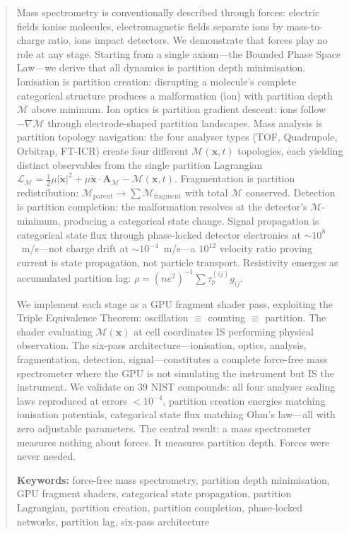 \documentclass[11pt,twocolumn,a4paper]{article}
\theoremstyle{definition}
\theoremstyle{remark}
\newcommand{\Depth}{\mathcal{M}}
\newcommand{\partinert}{\mu}
\newcommand{\taup}{\tau_p}
\newcommand{\Apartition}{\mathbf{A}_{\mathcal{M}}}
\newcommand{\Lagr}{\mathcal{L}}
\begin{document}
\begin{abstract}
Mass spectrometry is conventionally described through forces: electric fields ionise molecules, electromagnetic fields separate ions by mass-to-charge ratio, ions impact detectors. We demonstrate that forces play no role at any stage. Starting from a single axiom---the Bounded Phase Space Law---we derive that all dynamics is partition depth minimisation. Ionisation is partition creation: disrupting a molecule's complete categorical structure produces a malformation (ion) with partition depth $\Depth$ above minimum. Ion optics is partition gradient descent: ions follow $-\nabla\Depth$ through electrode-shaped partition landscapes. Mass analysis is partition topology navigation: the four analyser types (TOF, Quadrupole, Orbitrap, FT-ICR) create four different $\Depth(\mathbf{x},t)$ topologies, each yielding distinct observables from the single partition Lagrangian $\Lagr_\Depth = \frac{1}{2}\partinert|\dot{\mathbf{x}}|^2 + \partinert\dot{\mathbf{x}}\cdot\Apartition - \Depth(\mathbf{x},t)$. Fragmentation is partition redistribution: $\Depth_{\mathrm{parent}} \to \sum \Depth_{\mathrm{fragment}}$ with total $\Depth$ conserved. Detection is partition completion: the malformation resolves at the detector's $\Depth$-minimum, producing a categorical state change. Signal propagation is categorical state flux through phase-locked detector electronics at $\sim 10^8$~m/s---not charge drift at $\sim 10^{-4}$~m/s---a $10^{12}$ velocity ratio proving current is state propagation, not particle transport. Resistivity emerges as accumulated partition lag: $\rho = (ne^2)^{-1}\sum \taup^{(ij)} g_{ij}$.

We implement each stage as a GPU fragment shader pass, exploiting the Triple Equivalence Theorem: oscillation $\equiv$ counting $\equiv$ partition. The shader evaluating $\Depth(\mathbf{x})$ at cell coordinates IS performing physical observation. The six-pass architecture---ionisation, optics, analysis, fragmentation, detection, signal---constitutes a complete force-free mass spectrometer where the GPU is not simulating the instrument but IS the instrument. We validate on 39 NIST compounds: all four analyser scaling laws reproduced at errors $<10^{-4}$, partition creation energies matching ionisation potentials, categorical state flux matching Ohm's law---all with zero adjustable parameters. The central result: a mass spectrometer measures nothing about forces. It measures partition depth. Forces were never needed.

\medskip
\noindent\textbf{Keywords:} force-free mass spectrometry, partition depth minimisation, GPU fragment shaders, categorical state propagation, partition Lagrangian, partition creation, partition completion, phase-locked networks, partition lag, six-pass architecture
\end{abstract}
\end{document}
